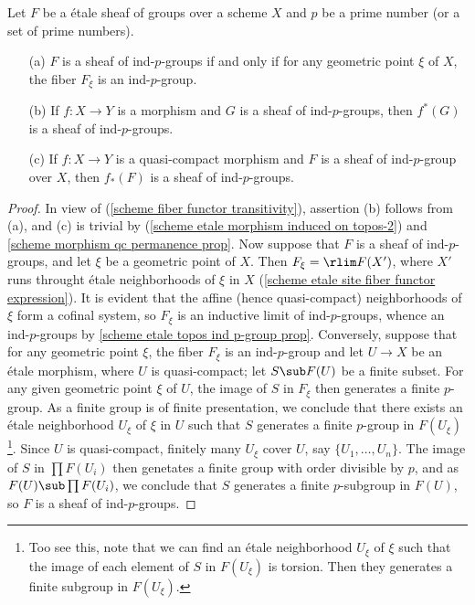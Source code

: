 \begin{proposition}\label{scheme etale sheaf ind p-group prop}
Let $F$ be a \'etale sheaf of groups over a scheme $X$ and $p$ be a prime number (or a set of prime numbers).
\begin{enumerate}
    \item[(a)] $F$ is a sheaf of ind-$p$-groups if and only if for any geometric point $\xi$ of $X$, the fiber $F_\xi$ is an ind-$p$-group.
    \item[(b)] If $f:X\to Y$ is a morphism and $G$ is a sheaf of ind-$p$-groups, then $f^*(G)$ is a sheaf of ind-$p$-groups.
    \item[(c)] If $f:X\to Y$ is a quasi-compact morphism and $F$ is a sheaf of ind-$p$-group over $X$, then $f_*(F)$ is a sheaf of ind-$p$-groups.
\end{enumerate}
\end{proposition}
\begin{proof}
In view of (\ref{scheme fiber functor transitivity}), assertion (b) follows from (a), and (c) is trivial by (\ref{scheme etale morphism induced on topos-2}) and \cref{scheme morphism qc permanence prop}. Now suppose that $F$ is a sheaf of ind-$p$-groups, and let $\xi$ be a geometric point of $X$. Then $F_\xi=\rlim F(X')$, where $X'$ runs throught \'etale neighborhoods of $\xi$ in $X$ (\cref{scheme etale site fiber functor expression}). It is evident that the affine (hence quasi-compact) neighborhoods of $\xi$ form a cofinal system, so $F_\xi$ is an inductive limit of ind-$p$-groups, whence an ind-$p$-groups by \cref{scheme etale topos ind p-group prop}. Conversely, suppose that for any geometric point $\xi$, the fiber $F_\xi$ is an ind-$p$-group and let $U\to X$ be an \'etale morphism, where $U$ is quasi-compact; let $S\sub F(U)$ be a finite subset. For any given geometric point $\xi$ of $U$, the image of $S$ in $F_\xi$ then generates a finite $p$-group. As a finite group is of finite presentation, we conclude that there exists an \'etale neighborhood $U_\xi$ of $\xi$ in $U$ such that $S$ generates a finite $p$-group in $F(U_\xi)$\footnote{Too see this, note that we can find an \'etale neighborhood $U_\xi$ of $\xi$ such that the image of each element of $S$ in $F(U_\xi)$ is torsion. Then they generates a finite subgroup in $F(U_\xi)$.}. Since $U$ is quasi-compact, finitely many $U_\xi$ cover $U$, say $\{U_1,\dots, U_n\}$. The image of $S$ in $\prod F(U_i)$ then genetates a finite group with order divisible by $p$, and as $F(U)\sub\prod F(U_i)$, we conclude that $S$ generates a finite $p$-subgroup in $F(U)$, so $F$ is a sheaf of ind-$p$-groups.
\end{proof}

